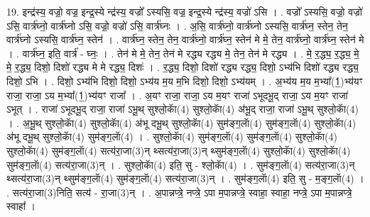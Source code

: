 \documentclass[17pt]{extarticle}
\begin{document}
19. इन्द्र॑स्य॒ वज्रो॒ वज्र॒ इन्द्र॒स्ये न्द्र॑स्य॒ वज्रो᳚ ऽस्यसि॒ वज्र॒ इन्द्र॒स्ये न्द्र॑स्य॒ वज्रो॑ ऽसि । . वज्रो᳚ ऽस्यसि॒ वज्रो॒ वज्रो॑ ऽसि॒ वार्त्र॑घ्नो॒ वार्त्र॑घ्नो ऽसि॒ वज्रो॒ वज्रो॑ ऽसि॒ वार्त्र॑घ्नः । . अ॒सि॒ वार्त्र॑घ्नो॒ वार्त्र॑घ्नो ऽस्यसि॒ वार्त्र॑घ्न॒ स्तेन॒ तेन॒ वार्त्र॑घ्नो ऽस्यसि॒ वार्त्र॑घ्न॒ स्तेन॑ । . वार्त्र॑घ्न॒ स्तेन॒ तेन॒ वार्त्र॑घ्नो॒ वार्त्र॑घ्न॒ स्तेन॑ मे मे॒ तेन॒ वार्त्र॑घ्नो॒ वार्त्र॑घ्न॒ स्तेन॑ मे । . वार्त्र॑घ्न॒ इति॒ वार्त्र॑ - घ्नः॒ । . तेन॑ मे मे॒ तेन॒ तेन॑ मे रद्ध्य रद्ध्य मे॒ तेन॒ तेन॑ मे रद्ध्य । . मे॒ र॒द्ध्य॒ र॒द्ध्य॒ मे॒ मे॒ र॒द्ध्य॒ दिशो॒ दिशो॑ रद्ध्य मे मे रद्ध्य॒ दिशः॑ । . र॒द्ध्य॒ दिशो॒ दिशो॑ रद्ध्य रद्ध्य॒ दिशो॒ ऽभ्य॑भि दिशो॑ रद्ध्य रद्ध्य॒ दिशो॒ ऽभि । . दिशो॒ ऽभ्य॑भि दिशो॒ दिशो॒ ऽभ्य॑य म॒य म॒भि दिशो॒ दिशो॒ ऽभ्य॑यम् । . अ॒भ्य॑य म॒य म॒भ्या᳚(1॒)भ्य॑यꣳ राजा॒ राजा॒ ऽय म॒भ्या᳚(1॒)भ्य॑यꣳ राजा᳚ । . अ॒यꣳ राजा॒ राजा॒ ऽय म॒यꣳ राजा॑ ऽभूदभू॒द् राजा॒ ऽय म॒यꣳ राजा॑ ऽभूत् । . राजा॑ ऽभूदभू॒द् राजा॒ राजा॑ ऽभू॒थ् सुश्लो॒काॅ(4) सुश्लो॒काॅ(4) अ॑भू॒द् राजा॒ राजा॑ ऽभू॒थ् सुश्लो॒काॅ(4) । . अ॒भू॒थ् सुश्लो॒काॅ(4) सुश्लो॒काॅ(4) अ॑भू दभू॒थ् सुश्लो॒काॅ(4) सुम॑ङ्ग॒लाॅ(4) सुम॑ङ्ग॒लाॅ(4) सुश्लो॒काॅ(4) 
अ॑भू दभू॒थ् सुश्लो॒काॅ(4) सुम॑ङ्ग॒लाॅ(4) । . सुश्लो॒काॅ(4) सुम॑ङ्ग॒लाॅ(4) सुम॑ङ्ग॒लाॅ(4) सुश्लो॒काॅ(4) सुश्लो॒काॅ(4) सुम॑ङ्ग॒लाॅ(4) सत्य॑रा॒जा(3)न् थ्सत्य॑रा॒जा(3)न् थ्सुम॑ङ्ग॒लाॅ(4) सुश्लो॒काॅ(4) सुश्लो॒काॅ(4) सुम॑ङ्ग॒लाॅ(4) सत्य॑रा॒जा(3)न् । . सुश्लो॒काॅ(4) इति॒ सु - श्लो॒काॅ(4) । . सुम॑ङ्ग॒लाॅ(4) सत्य॑रा॒जा(3)न् थ्सत्य॑रा॒जा(3)न् थ्सुम॑ङ्ग॒लाॅ(4) सुम॑ङ्ग॒लाॅ(4) सत्य॑रा॒जा(3)न् । . सुम॑ङ्ग॒लाॅ(4) इति॒ सु - म॒ङ्ग॒लाॅ(4) । . सत्य॑रा॒जा(3)निति॒ सत्य॑ - रा॒जा(3)न् । . अ॒पान्नप्त्रे॒ नप्त्रे॒ ऽपा म॒पान्नप्त्रे॒ स्वाहा॒ स्वाहा॒ नप्त्रे॒ ऽपा म॒पान्नप्त्रे॒ स्वाहा᳚ । \newline
\end{document}
